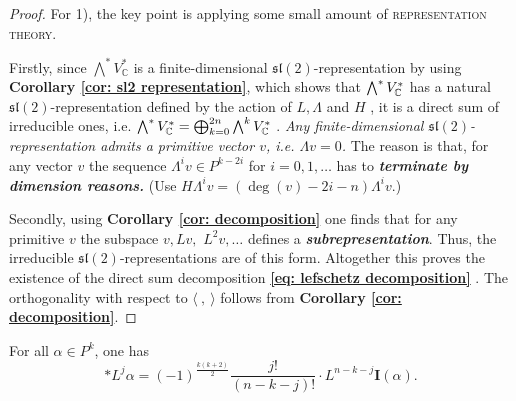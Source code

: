 \begin{proof}
  For 1), the key point is applying some small amount of \textsc{representation theory}. 
  
  Firstly, since $\bigwedge^* V_{\mathbb{C}}^*$ is a finite-dimensional $\mathfrak{s l}(2)$-representation by using \textbf{Corollary \ref{cor: sl2 representation}}, which shows that $\bigwedge^* V^*_{{\mathbb C}}$ has a natural $\mathfrak{sl}(2)$-representation defined by the action of $L,\Lambda$ and $H$ , it is a direct sum of irreducible ones, i.e. $\bigwedge^* V^*_{{\mathbb C}}=\bigoplus_{k=0}^{2n}\bigwedge^k V_{{\mathbb C}}^*$ . \textcolor[rgb]{0.79,0.17,0.46}{\emph{Any finite-dimensional $\mathfrak{s l}(2)$-representation admits a primitive vector $v$, i.e. $\Lambda v=0$.}} The reason is that, for any vector $v$ the sequence $\Lambda^i v\in P^{k-2i}$ for $i=0,1, \ldots$ has to \textit{\textbf{terminate by dimension reasons.}} (Use $H \Lambda^i v=(\operatorname{deg}(v)-2 i-n) \Lambda^i v$.) 
  
  Secondly, using \textbf{Corollary \ref{cor: decomposition}} one finds that \textcolor[rgb]{0.79,0.17,0.46}{ for any primitive $v$ the subspace $v, L v,$ $ L^2 v, \ldots$ defines a \textit{\textbf{subrepresentation}}.} Thus, the irreducible $\mathfrak{s l}(2)$-representations are of this form. Altogether this proves the existence of the direct sum decomposition \textbf{\eqref{eq: lefschetz decomposition}} . The orthogonality with respect to $\langle~,~\rangle$ follows from  \textbf{Corollary \ref{cor: decomposition}}.
\end{proof}
\begin{proposition}
  For all $\alpha\in P^k$, one has 
  \[*L^j \alpha=(-1)^{\frac{k(k+2)}{2}}\frac{j!}{(n-k-j)!}\cdot L^{n-k-j}\mathbf{I}(\alpha).\]
\end{proposition}
